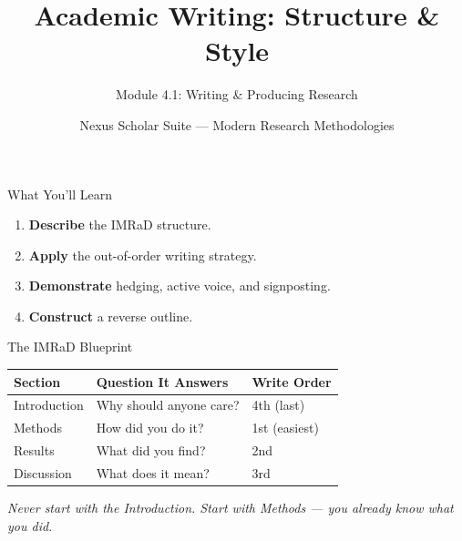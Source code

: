 \documentclass[aspectratio=169]{beamer}
\title{Academic Writing: Structure \& Style}
\subtitle{Module 4.1: Writing \& Producing Research}
\author{Nexus Scholar Suite --- Modern Research Methodologies}
\date{}
\begin{document}
\begin{frame}[plain]
  \titlepage
\end{frame}

\begin{frame}{What You'll Learn}
  \begin{enumerate}
    \item \textbf{Describe} the IMRaD structure.
    \item \textbf{Apply} the out-of-order writing strategy.
    \item \textbf{Demonstrate} hedging, active voice, and signposting.
    \item \textbf{Construct} a reverse outline.
  \end{enumerate}
\end{frame}

\begin{frame}{The IMRaD Blueprint}
  \begin{table}
  \begin{tabular}{lll}
  \toprule
  \textbf{Section} & \textbf{Question It Answers} & \textbf{Write Order} \\
  \midrule
  Introduction & Why should anyone care? & 4th (last) \\
  Methods & How did you do it? & 1st (easiest) \\
  Results & What did you find? & 2nd \\
  Discussion & What does it mean? & 3rd \\
  \bottomrule
  \end{tabular}
  \end{table}
  \vspace{0.3cm}
  \textit{Never start with the Introduction. Start with Methods --- you already know what you did.}
\end{frame}
\end{document}
